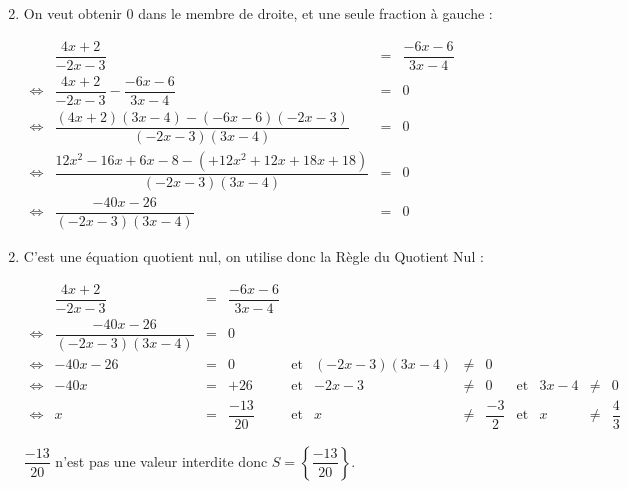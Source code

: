 \documentclass[15pt, mathserif]{beamer}
\begin{document}
 \begin{frame} 
 \begin{enumerate} \setcounter{enumi}{1}  
 	 \item On veut obtenir $0$ dans le membre de droite, et une seule fraction à gauche : 
 
 	 $\begin{array}{crcl} 
 	 	 & \dfrac{4x+2}{-2x-3} & = &\dfrac{-6x-6}{3x-4} \\ 
 	 \Leftrightarrow & \dfrac{4x+2}{-2x-3}-\dfrac{-6x-6}{3x-4} & = & 0 \\ 
 
 \Leftrightarrow & \dfrac{(4x+2)(3x-4)-(-6x-6)(-2x-3)}{(-2x-3)(3x-4)} & = & 0 \\ \Leftrightarrow & \dfrac{12x^2-16x+6x-8-(+12x^2+12x+18x+18)}{(-2x-3)(3x-4)}& = & 0 \\ \Leftrightarrow & \dfrac{-40x-26}{(-2x-3)(3x-4)} & = & 0 
 	 \end{array}$ 
 \end{enumerate} 
 \end{frame} 
 \begin{frame} 
 \begin{enumerate} \setcounter{enumi}{1}  
 	 \item C'est une équation quotient nul, on utilise donc la Règle du Quotient Nul :
 
  \tiny{$\begin{array}{crclcrclcrcl} 
 
 	  & \dfrac{4x+2}{-2x-3} & = &\dfrac{-6x-6}{3x-4} & & & & & & & & \\ 
 	 \Leftrightarrow & \dfrac{-40x-26}{(-2x-3)(3x-4)} & = & 0 & & & & & & & & \\ 
 	 \Leftrightarrow & -40x-26 & =& 0 & \text{et} & (-2x-3)(3x-4) & \neq & 0 \\ 
 	 \Leftrightarrow & -40x&=&+26& \text{et} & -2x-3& \neq & 0 & \text{et} & 3x-4& \neq & 0 \\ 
 	 \Leftrightarrow & x&=&\dfrac{-13}{20} & \text{et} & x &\neq&\dfrac{-3}{2} & \text{et} & x & \neq&\dfrac{4}{3}
 
 \end{array}$} 
 
 \bigskip 
 
 \normalsize{ $ \dfrac{-13}{20} $ n'est pas une valeur interdite donc $S=\left\{ \dfrac{-13}{20}\right\}$.} 
 
 \end{enumerate} \end{frame}
\end{document}
